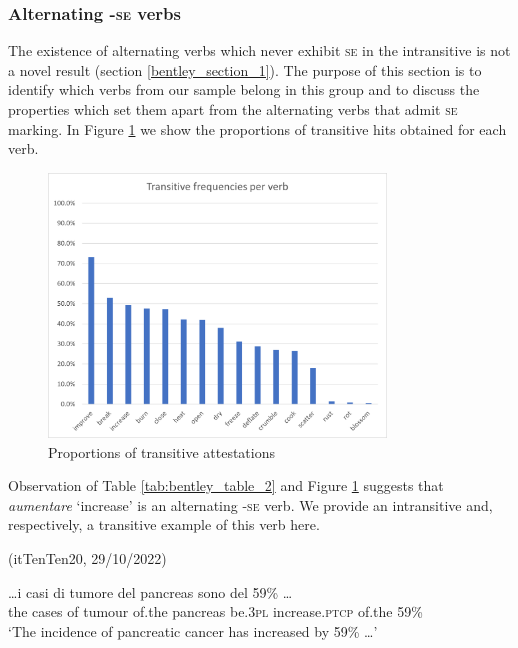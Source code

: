 \documentclass[output=paper,colorlinks,citecolor=brown
]{langscibook}
\begin{document}
\subsubsection{Alternating -\textsc{se} verbs}
\label{bentley_section_3.3.1}
The existence of alternating verbs which never exhibit \textsc{se} in the intransitive is not a novel result (section \ref{bentley_section_1}). The purpose of this section is to identify which verbs from our sample belong in this group and to discuss the properties which set them apart from the alternating verbs that admit \textsc{se} marking. In Figure \ref{fig:bentley_figure_2} we show the proportions of transitive hits obtained for each verb.

\begin{figure}[hbt!]
\centering
\includegraphics[width=0.8\textwidth]{bentley_figure2.png}
\caption{\label{fig:bentley_figure_2}Proportions of transitive attestations }
\end{figure}    

Observation of Table \ref{tab:bentley_table_2} and Figure \ref{fig:bentley_figure_2} suggests that \textit{aumentare} ‘increase’ is an alternating   -\textsc{se} verb. We provide an intransitive and, respectively, a transitive example of this verb here.

\hspace*{\fill}(itTenTen20, 29/10/2022)\quad

\ea \label{bentley_example_8}
    \gll  \ldots  i casi di tumore del pancreas sono  del 59\%  \ldots  \\
    the cases of tumour of.the pancreas be.3\textsc{pl} increase.\textsc{ptcp} of.the 59\% \\
    \glt ‘The incidence of pancreatic cancer has increased by 59\% \ldots ’
\z
\end{document}
